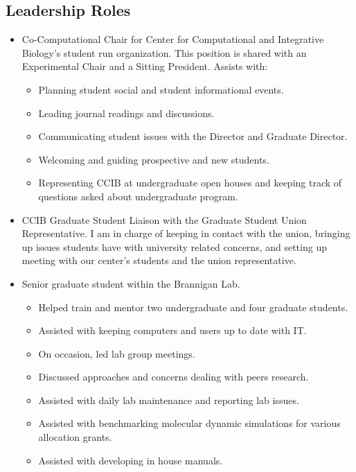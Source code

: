 \subsection*{Leadership Roles}
\begin{itemize}

\item Co-Computational Chair for Center for Computational and Integrative Biology's student run organization. This position is shared with an Experimental Chair and a Sitting President. Assists with:
\begin{itemize}
	\item Planning student social and student informational events.
	\item Leading journal readings and discussions.
	\item Communicating student issues with the Director and Graduate Director.
	\item Welcoming and guiding prospective and new students.
	\item Representing CCIB at undergraduate open houses and keeping track of questions asked about undergraduate program.
\end{itemize}
\vspace{2pt}
\item CCIB Graduate Student Liaison with the Graduate Student Union Representative. I am in charge of keeping in contact with the union, bringing up issues students have with university related concerns, and setting up meeting with our center's students and the union representative.
\vspace{2pt}
\item Senior graduate student within the Brannigan Lab. 
\begin{itemize}
	\item Helped train and mentor two undergraduate and four graduate students.
	\item Assisted with keeping computers and users up to date with IT.
	\item On occasion, led lab group meetings.
	\item Discussed approaches and concerns dealing with peers research.
	\item Assisted with daily lab maintenance and reporting lab issues.
	\item Assisted with benchmarking molecular dynamic simulations for various allocation grants.
	\item Assisted with developing in house manuals.
\end{itemize} 
\vspace{4pt}
\end{itemize}
